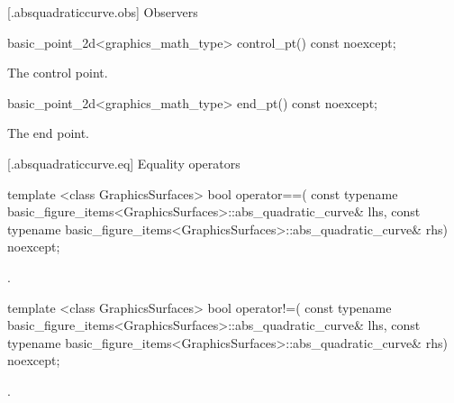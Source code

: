  [\iotwod.absquadraticcurve.obs] {Observers}

%
\begin{itemdecl}
basic_point_2d<graphics_math_type> control_pt() const noexcept;
\end{itemdecl}
\begin{itemdescr}
\pnum
\returns The control point.
\end{itemdescr}

%
\begin{itemdecl}
basic_point_2d<graphics_math_type> end_pt() const noexcept;
\end{itemdecl}
\begin{itemdescr}
\pnum
\returns The end point.
\end{itemdescr}

 [\iotwod.absquadraticcurve.eq] {Equality operators}%

%
\begin{itemdecl}
template <class GraphicsSurfaces>
bool operator==(
  const typename basic_figure_items<GraphicsSurfaces>::abs_quadratic_curve& lhs,
  const typename basic_figure_items<GraphicsSurfaces>::abs_quadratic_curve& rhs) 
  noexcept;
\end{itemdecl}
\begin{itemdescr}
\pnum
\returns
{}.
\end{itemdescr}

%
\begin{itemdecl}
template <class GraphicsSurfaces>
bool operator!=(
  const typename basic_figure_items<GraphicsSurfaces>::abs_quadratic_curve& lhs,
  const typename basic_figure_items<GraphicsSurfaces>::abs_quadratic_curve& rhs) 
  noexcept;
\end{itemdecl}
\begin{itemdescr}
\pnum
\returns
{}.
\end{itemdescr}
